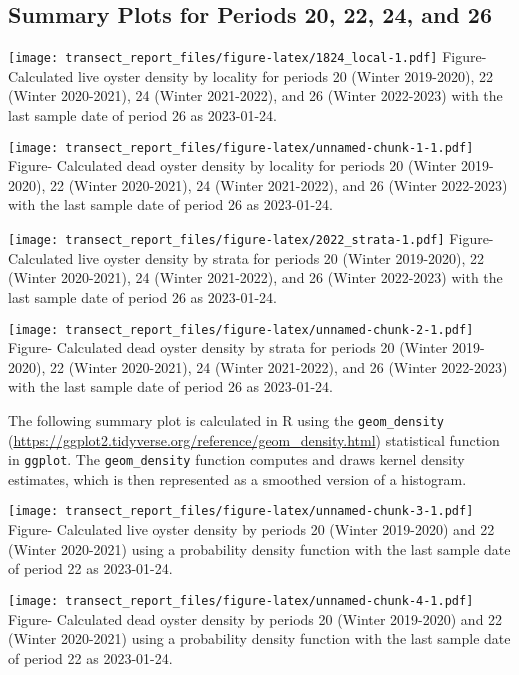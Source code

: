\documentclass[
]{article}
\begin{document}
\newpage

\hypertarget{summary-plots-for-periods-20-22-24-and-26}{%
\subsection{Summary Plots for Periods 20, 22, 24, and
26}\label{summary-plots-for-periods-20-22-24-and-26}}

\texttt{[image: transect\_report\_files/figure-latex/1824\_local-1.pdf]}
Figure- Calculated live oyster density by locality for periods 20
(Winter 2019-2020), 22 (Winter 2020-2021), 24 (Winter 2021-2022), and 26
(Winter 2022-2023) with the last sample date of period 26 as 2023-01-24.
\newpage

\texttt{[image: transect\_report\_files/figure-latex/unnamed-chunk-1-1.pdf]}
Figure- Calculated dead oyster density by locality for periods 20
(Winter 2019-2020), 22 (Winter 2020-2021), 24 (Winter 2021-2022), and 26
(Winter 2022-2023) with the last sample date of period 26 as 2023-01-24.
\newpage

\texttt{[image: transect\_report\_files/figure-latex/2022\_strata-1.pdf]}
Figure- Calculated live oyster density by strata for periods 20 (Winter
2019-2020), 22 (Winter 2020-2021), 24 (Winter 2021-2022), and 26 (Winter
2022-2023) with the last sample date of period 26 as 2023-01-24.
\newpage

\texttt{[image: transect\_report\_files/figure-latex/unnamed-chunk-2-1.pdf]}
Figure- Calculated dead oyster density by strata for periods 20 (Winter
2019-2020), 22 (Winter 2020-2021), 24 (Winter 2021-2022), and 26 (Winter
2022-2023) with the last sample date of period 26 as 2023-01-24.
\newpage

The following summary plot is calculated in R using the
\texttt{geom\_density}
(\url{https://ggplot2.tidyverse.org/reference/geom_density.html})
statistical function in \texttt{ggplot}. The \texttt{geom\_density}
function computes and draws kernel density estimates, which is then
represented as a smoothed version of a histogram.

\texttt{[image: transect\_report\_files/figure-latex/unnamed-chunk-3-1.pdf]}
Figure- Calculated live oyster density by periods 20 (Winter 2019-2020)
and 22 (Winter 2020-2021) using a probability density function with the
last sample date of period 22 as 2023-01-24. \newpage

\texttt{[image: transect\_report\_files/figure-latex/unnamed-chunk-4-1.pdf]}
Figure- Calculated dead oyster density by periods 20 (Winter 2019-2020)
and 22 (Winter 2020-2021) using a probability density function with the
last sample date of period 22 as 2023-01-24. \newpage
\end{document}

